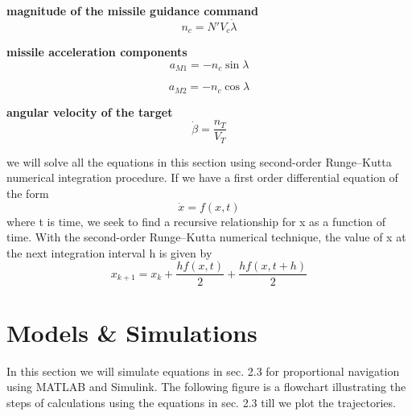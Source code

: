 \textbf{magnitude of the missile guidance command}
\begin{equation}
		n_c= N' V_c \dot{\lambda}
\end{equation}

\textbf{missile acceleration components}
\begin{equation}
	a_{M1} = - n_c \sin \lambda
\end{equation}

\begin{equation}
a_{M2} = - n_c \cos \lambda
\end{equation}

\textbf{angular velocity of the target}
\begin{equation}
	\dot{\beta} = \dfrac{n_T}{V_T}
\end{equation}

we will solve all the equations in this section using second-order Runge–Kutta numerical integration procedure. If we have a first order differential equation of the form 
\begin{equation*}
	\dot{x} = f(x,t) 
\end{equation*} 
 where t is time, we seek to find a recursive relationship for x as a function of time.
 With the second-order Runge–Kutta numerical technique, the value of x at the
 next integration interval h is given by
 \begin{equation*}
 	x_{k+1} = x_k + \dfrac{hf(x,t)}{2} + \dfrac{h f(x, t+h)}{2}
 \end{equation*}
\section{Models \& Simulations}

In this section we will simulate equations in sec. 2.3 for proportional navigation using MATLAB and Simulink.
The following figure is a flowchart illustrating the steps of calculations using the equations in sec. 2.3  till we plot the trajectories.

